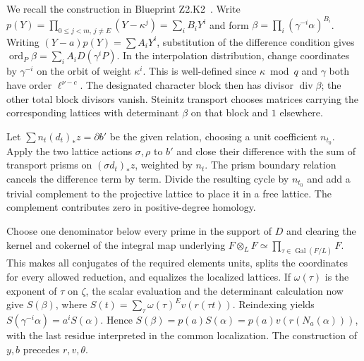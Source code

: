 \begin{outline}
We recall the construction in Blueprint Z2.K2~. Write
\(p(Y)=\prod_{0\le j<m,\,j\ne E}(Y-\kappa^j)=\sum_i B_iY^i\)
and form \(\beta=\prod_i(\gamma^{-i}\alpha)^{B_i}\).
Writing \((Y-a)p(Y)=\sum A_iY^i\), substitution of the difference
condition gives \(\operatorname{ord}_P\beta=\sum_iA_iD(\gamma^iP)\).
In the interpolation distribution, change coordinates by
\(\gamma^{-i}\) on the orbit of weight \(\kappa^i\). This is
well-defined since \(\kappa\bmod q\) and \(\gamma\) both have order
\(\ell^{\nu-c}\). The designated character block then has divisor
\(\operatorname{div}\beta\); the other total block divisors vanish.
Steinitz transport chooses matrices carrying the corresponding
lattices with determinant \(\beta\) on that block and \(1\) elsewhere.

Let \(\sum n_t(d_t)_*z=\partial b'\) be the given relation, choosing
a unit coefficient \(n_{t_0}\). Apply the two lattice actions
\(\sigma,\rho\) to \(b'\) and close their difference with the sum of
transport prisms on \((\sigma d_t)_*z\), weighted by \(n_t\). The
prism boundary relation cancels the difference term by term.
Divide the resulting cycle by \(n_{t_0}\) and add a trivial
complement to the projective lattice to place it in a free lattice.
The complement contributes zero in positive-degree homology.

Choose one denominator below every prime in the support of \(D\)
and clearing the kernel and cokernel of the integral map underlying
\(F\otimes_LF\simeq\prod_{\tau\in\operatorname{Gal}(F/L)}F\).
This makes all conjugates of the required elements units, splits the
coordinates for every allowed reduction, and equalizes the localized
lattices. If \(\omega(\tau)\) is the exponent of \(\tau\) on \(\zeta\),
the scalar evaluation and the determinant calculation now give
\(S(\beta)\), where \(S(t)=\sum_\tau\omega(\tau)^E v(r(\tau t))\).
Reindexing yields \(S(\gamma^{-i}\alpha)=a^iS(\alpha)\). Hence
\(S(\beta)=p(a)S(\alpha)=p(a)v(r(N_a(\alpha)))\), with the last
residue interpreted in the common localization. The construction of
\(y,b\) precedes \(r,v,\theta\).
\end{outline}
